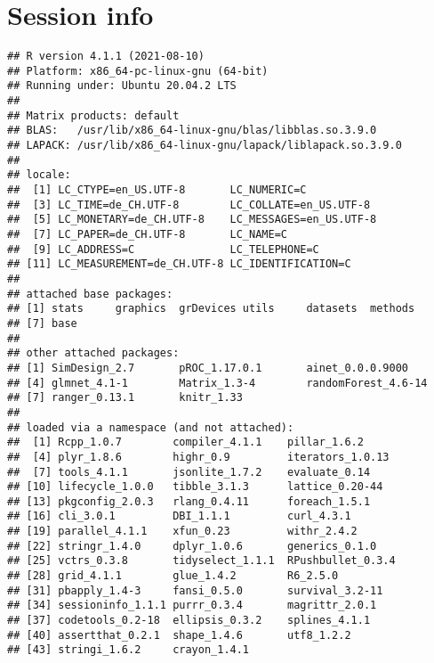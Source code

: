 \documentclass[a4paper, 11pt]{article}\usepackage[]{graphicx}\usepackage[]{color}
\makeatletter
\newenvironment{kframe}{%
 \def\at@end@of@kframe{}%
 \ifinner\ifhmode%
  \def\at@end@of@kframe{\end{minipage}}%
  \begin{minipage}{\columnwidth}%
 \fi\fi%
 \def\FrameCommand##1{\hskip\@totalleftmargin \hskip-\fboxsep
 \colorbox{shadecolor}{##1}\hskip-\fboxsep
     \hskip-\linewidth \hskip-\@totalleftmargin \hskip\columnwidth}%
 \MakeFramed {\advance\hsize-\width
   \@totalleftmargin\z@ \linewidth\hsize
   \@setminipage}}%
 {\par\unskip\endMakeFramed%
 \at@end@of@kframe}
\newenvironment{knitrout}{}{} %
\makeatother
\begin{document}



\section{Session info}

\begin{knitrout}
\color{fgcolor}\begin{kframe}
\begin{verbatim}
## R version 4.1.1 (2021-08-10)
## Platform: x86_64-pc-linux-gnu (64-bit)
## Running under: Ubuntu 20.04.2 LTS
## 
## Matrix products: default
## BLAS:   /usr/lib/x86_64-linux-gnu/blas/libblas.so.3.9.0
## LAPACK: /usr/lib/x86_64-linux-gnu/lapack/liblapack.so.3.9.0
## 
## locale:
##  [1] LC_CTYPE=en_US.UTF-8       LC_NUMERIC=C              
##  [3] LC_TIME=de_CH.UTF-8        LC_COLLATE=en_US.UTF-8    
##  [5] LC_MONETARY=de_CH.UTF-8    LC_MESSAGES=en_US.UTF-8   
##  [7] LC_PAPER=de_CH.UTF-8       LC_NAME=C                 
##  [9] LC_ADDRESS=C               LC_TELEPHONE=C            
## [11] LC_MEASUREMENT=de_CH.UTF-8 LC_IDENTIFICATION=C       
## 
## attached base packages:
## [1] stats     graphics  grDevices utils     datasets  methods  
## [7] base     
## 
## other attached packages:
## [1] SimDesign_2.7       pROC_1.17.0.1       ainet_0.0.0.9000   
## [4] glmnet_4.1-1        Matrix_1.3-4        randomForest_4.6-14
## [7] ranger_0.13.1       knitr_1.33         
## 
## loaded via a namespace (and not attached):
##  [1] Rcpp_1.0.7        compiler_4.1.1    pillar_1.6.2     
##  [4] plyr_1.8.6        highr_0.9         iterators_1.0.13 
##  [7] tools_4.1.1       jsonlite_1.7.2    evaluate_0.14    
## [10] lifecycle_1.0.0   tibble_3.1.3      lattice_0.20-44  
## [13] pkgconfig_2.0.3   rlang_0.4.11      foreach_1.5.1    
## [16] cli_3.0.1         DBI_1.1.1         curl_4.3.1       
## [19] parallel_4.1.1    xfun_0.23         withr_2.4.2      
## [22] stringr_1.4.0     dplyr_1.0.6       generics_0.1.0   
## [25] vctrs_0.3.8       tidyselect_1.1.1  RPushbullet_0.3.4
## [28] grid_4.1.1        glue_1.4.2        R6_2.5.0         
## [31] pbapply_1.4-3     fansi_0.5.0       survival_3.2-11  
## [34] sessioninfo_1.1.1 purrr_0.3.4       magrittr_2.0.1   
## [37] codetools_0.2-18  ellipsis_0.3.2    splines_4.1.1    
## [40] assertthat_0.2.1  shape_1.4.6       utf8_1.2.2       
## [43] stringi_1.6.2     crayon_1.4.1
\end{verbatim}
\end{kframe}
\end{knitrout}



% 
% 
\end{document}

